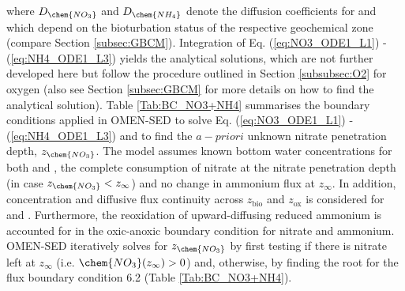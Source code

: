 \documentclass[gmd, manuscript]{copernicus}
\begin{document}
where $D_\chem{NO_3}$ and $D_{\chem{NH_4}}$ denote the diffusion coefficients for  and  which depend on the bioturbation status of the respective geochemical zone (compare Section \ref{subsec:GBCM}). 
Integration of Eq. (\ref{eq:NO3_ODE1_L1}) - (\ref{eq:NH4_ODE1_L3}) yields the analytical solutions, which are not further developed here but follow the procedure outlined in Section \ref{subsubsec:O2} for oxygen 
(also see Section \ref{subsec:GBCM} for more details on how to find the analytical solution). Table \ref{Tab:BC_NO3+NH4} summarises the boundary conditions applied in OMEN-SED to solve Eq. (\ref{eq:NO3_ODE1_L1}) - (\ref{eq:NH4_ODE1_L3}) 
and to find the $a-priori$ unknown nitrate penetration depth, $z_\chem{NO_3}$. 
The model assumes known bottom water concentrations for both  and , the complete consumption of nitrate at the nitrate penetration depth (in case  $z_{\chem{NO_3}} < z_\infty$) and no change in %
ammonium flux at $z_\infty$. In addition, concentration and diffusive flux continuity across $z_{\mathrm{bio}}$ and $z_{\mathrm{ox}}$ is considered for  and . 
Furthermore, the reoxidation of upward-diffusing reduced ammonium is accounted for in the oxic-anoxic boundary condition for nitrate and ammonium. 
OMEN-SED iteratively solves for $z_{\chem{NO_3}}$ by first testing if there is nitrate left at $z_\infty$ (i.e. $\chem{NO_3}(z_\infty) > 0$) and, otherwise, by finding the root for the flux 
boundary condition 6.2 (Table \ref{Tab:BC_NO3+NH4}).
\end{document}
